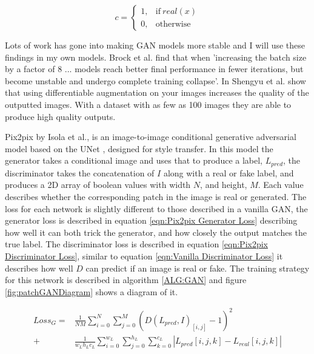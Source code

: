 \documentclass{UoYCSproject}
\begin{document}
\[ c =
\begin{cases}
  1, & \text{if}\ real(x) \\
  0, & \text{otherwise}
\end{cases} \]

Lots of work has gone into making GAN models more stable and I will use these findings in my own models. Brock et al. find that when 'increasing the batch size by a factor of 8 ... models reach better final performance in fewer iterations, but become unstable and undergo complete training collapse'\cite[3]{brock2019large}. In \cite{zhao2020differentiable} Shengyu et al. show that using differentiable augmentation on your images increases the quality of the outputted images. With a dataset with as few as 100 images they are able to produce high quality outputs.

Pix2pix by Isola et al.\cite{isola2018imagetoimage}, is an image-to-image conditional generative adversarial model based on the UNet \cite{ronneberger2015unet}, designed for style transfer. In this model the generator takes a conditional image and uses that to produce a label, $L_{pred}$, the discriminator takes the concatenation of $I$ along with a real or fake label, and produces a 2D array of boolean values with width $N$, and height, $M$. Each value describes whether the corresponding patch in the image is real or generated. The loss for each network is slightly different to those described in a vanilla GAN, the generator loss is described in equation \ref{eqn:Pix2pix Generator Loss} describing how well it can both trick the generator, and how closely the output matches the true label. The discriminator loss is described in equation \ref{eqn:Pix2pix Discriminator Loss}, similar to equation \ref{eqn:Vanilla Discriminator Loss} it describes how well $ D $ can predict if an image is real or fake. The training strategy for this network is described in algorithm \ref{ALG:GAN} and figure \ref{fig:patchGANDiagram} shows a diagram of it.

\begin{equation}
    \label{eqn:Pix2pix Generator Loss}
    \begin{split}
    Loss_G = & \frac{1}{NM} \sum_{i=0}^{N} \sum_{j=0}^{M} (D(L_{pred}, I)_{[i,j]} -1 )^2\\
           + & \frac{1}{w_Lh_Lc_L} \sum_{i=0}^{w_L} \sum_{j=0}^{h_L} \sum_{k=0}^{c_L} |L_{pred}[i,j,k] - L_{real}[i,j,k]|
    \end{split}    
\end{equation}
\end{document}
